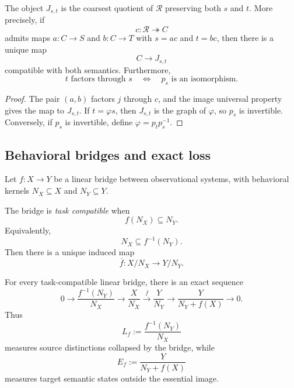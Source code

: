 \begin{theorem}
\label{thm:block18-universal-joint-completion}
The object \(J_{s,t}\) is the coarsest quotient of \(\mathcal R\) preserving both \(s\) and \(t\).  More precisely, if
\[
 c:\mathcal R\twoheadrightarrow C
\]
admits maps \(a:C\to S\) and \(b:C\to T\) with \(s=ac\) and \(t=bc\), then there is a unique map
\[
 C\longrightarrow J_{s,t}
\]
compatible with both semantics.  Furthermore,
\[
 t\text{ factors through }s
 \quad\Longleftrightarrow\quad
 p_s\text{ is an isomorphism}.
\]
\end{theorem}

\begin{proof}
The pair \((a,b)\) factors \(j\) through \(c\), and the image universal property gives the map to \(J_{s,t}\).  If \(t=\varphi s\), then \(J_{s,t}\) is the graph of \(\varphi\), so \(p_s\) is invertible.  Conversely, if \(p_s\) is invertible, define \(\varphi=p_t p_s^{-1}\).
\end{proof}

\subsection{Behavioral bridges and exact loss}
\label{subsec:block18-bridge-loss}

Let \(f:X\to Y\) be a linear bridge between observational systems, with behavioral kernels \(N_X\subseteq X\) and \(N_Y\subseteq Y\).

\begin{definition}
\label{def:block18-task-compatible-bridge}
The bridge is \emph{task compatible} when
\[
 f(N_X)\subseteq N_Y.
\]
Equivalently,
\[
 N_X\subseteq f^{-1}(N_Y).
\]
Then there is a unique induced map
\[
 \overline f:X/N_X\longrightarrow Y/N_Y.
\]
\end{definition}

\begin{theorem}
\label{thm:block18-bridge-loss-exact}
For every task-compatible linear bridge, there is an exact sequence
\[
 0\longrightarrow
 \frac{f^{-1}(N_Y)}{N_X}
 \longrightarrow
 \frac{X}{N_X}
 \xrightarrow{\overline f}
 \frac{Y}{N_Y}
 \longrightarrow
 \frac{Y}{N_Y+f(X)}
 \longrightarrow0.
\]
Thus
\[
 L_f:=\frac{f^{-1}(N_Y)}{N_X}
\]
measures source distinctions collapsed by the bridge, while
\[
 E_f:=\frac{Y}{N_Y+f(X)}
\]
measures target semantic states outside the essential image.
\end{theorem}


